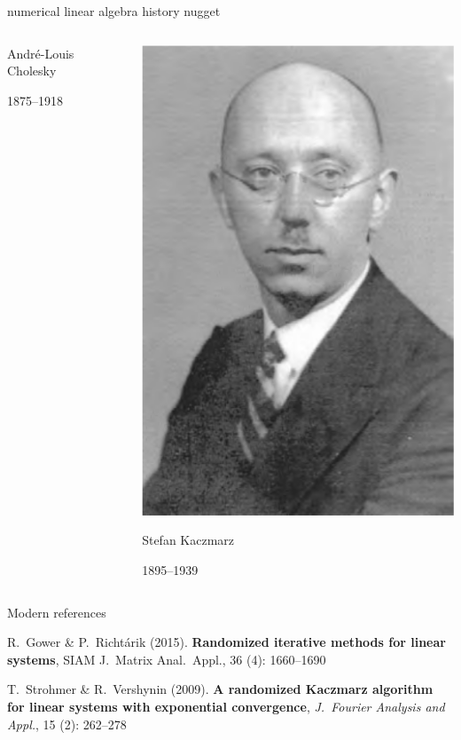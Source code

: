 \documentclass[usepdftitle=false,usenames,dvipsnames]{beamer}
\begin{document}
\begin{frame}{numerical linear algebra history nugget}
\begin{columns}
\begin{column}{0.3\textwidth}
\footnotesize
Andr\'e-Louis Cholesky

1875--1918
\end{column}
\begin{column}{0.3\textwidth}
\centering
\includegraphics[height=0.5\textheight]{figs/StefanKaczmarz}

\footnotesize
Stefan Kaczmarz

1895--1939
\end{column}
\end{columns}
\end{frame}


\begin{frame}{Modern references}

\begin{thebibliography}{1}

  R.~Gower \& P.~Richt\'arik (2015).  \textbf{Randomized iterative methods for linear systems}, SIAM J.~Matrix Anal.~Appl., 36 (4): 1660--1690

  T.~Strohmer \& R.~Vershynin (2009). \textbf{A randomized Kaczmarz algorithm for linear systems with exponential convergence}, \emph{J.~Fourier Analysis and Appl.}, 15 (2): 262--278
\end{thebibliography}
\end{frame}
\end{document}
